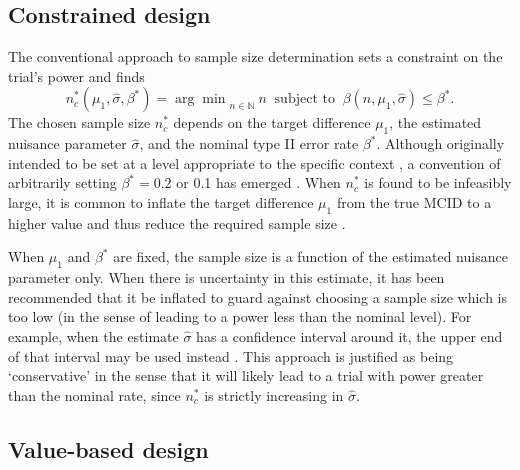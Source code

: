 \documentclass[sagev, Crown]{sagej}
\begin{document}
\subsection{Constrained design}


The conventional approach to sample size determination sets a constraint on the trial's power and finds
\begin{equation}
n^*_c (\mu_1, \hat{\sigma}, \beta^*) = {\arg\min}_{n \in \mathbb{N}}~ n ~\text{ subject to } ~ \beta(n, \mu_1, \hat{\sigma}) \leq \beta^*.
\end{equation}
The chosen sample size $n^*_c$ depends on the target difference $\mu_1$, the estimated nuisance parameter $\hat{\sigma}$, and the nominal type II error rate $\beta^*$. Although originally intended to be set at a level appropriate to the specific context \cite{}, a convention of arbitrarily setting $\beta^* = 0.2$ or 0.1 has emerged \cite{Bacchetti2019}. When $n^*_c$ is found to be infeasibly large, it is common to inflate the target difference $\mu_1$ from the true MCID to a higher value and thus reduce the required sample size \cite{Schulz2005}.

When $\mu_1$ and $\beta^*$ are fixed, the sample size is a function of the estimated nuisance parameter only. When there is uncertainty in this estimate, it has been recommended that it be inflated to guard against choosing a sample size which is too low (in the sense of leading to a power less than the nominal level). For example, when the estimate $\hat{\sigma}$ has a confidence interval around it, the upper end of that interval may be used instead \cite{Browne1995, Teare2014, Whitehead2015}. This approach is justified as being `conservative' in the sense that it will likely lead to a trial with power greater than the nominal rate, since $n^*_c$ is strictly increasing in $\hat{\sigma}$. 

\subsection{Value-based design}

\end{document}
